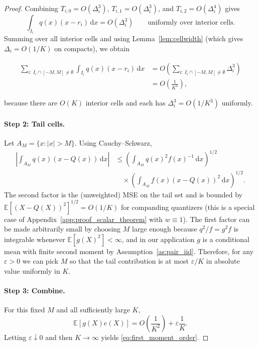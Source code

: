 \documentclass{article}
\newcommand{\E}{\mathbb{E}}
\newcommand{\abs}[1]{\left\lvert #1 \right\rvert}
\newcommand{\dd}{\,\mathrm{d}}
\begin{document}
\begin{proof}
Combining $T_{i,0}=O(\Delta_i^3)$, $T_{i,1}=O(\Delta_i^3)$, and $T_{i,2}=O(\Delta_i^4)$ gives
\[
\int_{I_i} q(x)(x-r_i)\dd x = O(\Delta_i^3)
\qquad\text{uniformly over interior cells.}
\]
Summing over all interior cells and using Lemma~\ref{lem:cellwidth} (which gives $\Delta_i=O(1/K)$ on compacts), we obtain

\begin{align*}
\sum_{i:\,I_i\cap[-M,M]\neq\emptyset}\int_{I_i} q(x)(x-r_i)\dd x
&= O\!\left(\sum_{i:\,I_i\cap[-M,M]\neq\emptyset}\Delta_i^3\right)\\
&= O\!\left(\frac{1}{K^2}\right),
\end{align*}

because there are $O(K)$ interior cells and each has $\Delta_i^3=O(1/K^3)$ uniformly.

\paragraph*{Step 2: Tail cells.}
Let $A_M=\{x:\abs{x}>M\}$. Using Cauchy--Schwarz,
\begin{align*}
\abs{\int_{A_M} q(x)(x-Q(x))\dd x}
&\le \left(\int_{A_M} q(x)^2 f(x)^{-1}\dd x\right)^{1/2} \\
&\quad \times \left(\int_{A_M} f(x)(x-Q(x))^2\dd x\right)^{1/2}.
\end{align*}
The second factor is the (unweighted) MSE on the tail set and is bounded by $\E[(X-Q(X))^2]^{1/2}=O(1/K)$ for companding quantizers (this is a special case of Appendix~\ref{app:proof_scalar_theorem} with $w\equiv 1$).
The first factor can be made arbitrarily small by choosing $M$ large enough because $q^2/f=g^2 f$ is integrable whenever $\E[g(X)^2]<\infty$, and in our application $g$ is a conditional mean with finite second moment by Assumption~\ref{as:pair_iid}.
Therefore, for any $\varepsilon>0$ we can pick $M$ so that the tail contribution is at most $\varepsilon/K$ in absolute value uniformly in $K$.

\paragraph*{Step 3: Combine.}
For this fixed $M$ and all sufficiently large $K$,
\[
\E[g(X)e(X)] = O\!\left(\frac{1}{K^2}\right)+\varepsilon\frac{1}{K}.
\]
Letting $\varepsilon\downarrow 0$ and then $K\to\infty$ yields \eqref{eq:first_moment_order}.
\end{proof}
\end{document}
